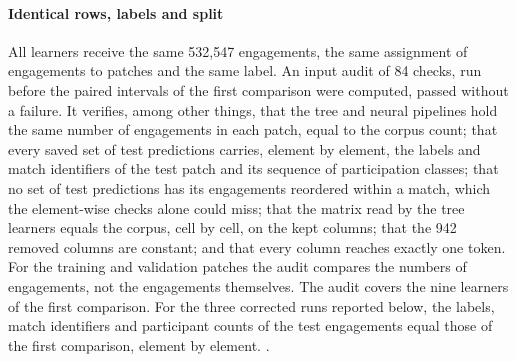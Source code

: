 \paragraph{Identical rows, labels and split}
All learners receive the same 532,547 engagements, the same assignment of engagements to patches and the
same label. An input audit of 84 checks, run before the paired intervals of the first comparison were
computed, passed without a failure. It verifies, among other things, that the tree and neural pipelines
hold the same number of engagements in each patch, equal to the corpus count; that every saved set of test
predictions carries, element by element, the labels and match identifiers of the test patch and its
sequence of participation classes; that no set of test predictions has its engagements reordered
within a match, which the element-wise checks alone could miss; that the matrix read by the tree learners
equals the corpus, cell by cell, on the kept columns; that the 942 removed columns are constant; and that
every column reaches exactly one token. For the training and validation patches the audit compares the
numbers of engagements, not the engagements themselves. The audit covers the nine learners of the first
comparison. For the three corrected runs reported below, the labels, match identifiers and participant
counts of the test engagements equal those of the first comparison, element by element.
.

